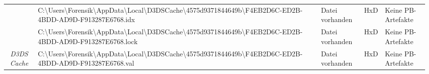\begin{appendices}
{\begin{landscape}
\begin{table}[h!]
{\begin{tabular}{cllll}
		\multicolumn{1}{|c|}{}                                                   & \multicolumn{1}{l|}{\cellcolor[HTML]{3190FF}C:\textbackslash{}Users\textbackslash{}Forensik\textbackslash{}AppData\textbackslash{}Local\textbackslash{}D3DSCache\textbackslash{}4575d9371844649b\textbackslash{}F4EB2D6C-ED2B-4BDD-AD9D-F913287E6768.idx}                                                                                & \multicolumn{1}{l|}{\cellcolor[HTML]{009901}Datei vorhanden}                                        & \multicolumn{1}{l|}{HxD}                                   & \multicolumn{1}{l|}{\cellcolor[HTML]{F8A102}Keine PB-Artefakte} \\ \cline{2-5} 
		\multicolumn{1}{|c|}{}                                                   & \multicolumn{1}{l|}{\cellcolor[HTML]{3190FF}C:\textbackslash{}Users\textbackslash{}Forensik\textbackslash{}AppData\textbackslash{}Local\textbackslash{}D3DSCache\textbackslash{}4575d9371844649b\textbackslash{}F4EB2D6C-ED2B-4BDD-AD9D-F913287E6768.lock}                                                                               & \multicolumn{1}{l|}{\cellcolor[HTML]{009901}Datei vorhanden}                                        & \multicolumn{1}{l|}{HxD}                                   & \multicolumn{1}{l|}{\cellcolor[HTML]{F8A102}Keine PB-Artefakte} \\ \cline{2-5} 
		\multicolumn{1}{|c|}{\multirow{-3}{*}{\textit{D3DS Cache}}}              & \cellcolor[HTML]{3190FF}C:\textbackslash{}Users\textbackslash{}Forensik\textbackslash{}AppData\textbackslash{}Local\textbackslash{}D3DSCache\textbackslash{}4575d9371844649b\textbackslash{}F4EB2D6C-ED2B-4BDD-AD9D-F913287E6768.val                                                                                                     & \multicolumn{1}{l|}{\cellcolor[HTML]{009901}Datei vorhanden}                                        & \multicolumn{1}{l|}{HxD}                                   & \multicolumn{1}{l|}{\cellcolor[HTML]{F8A102}Keine PB-Artefakte} \\ \hline
	\end{tabular}
}
\end{table}
\end{landscape}
}
\restoregeometry


\end{appendices}
